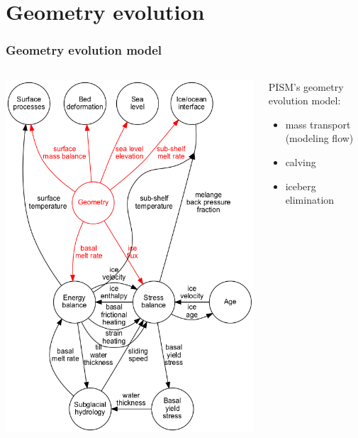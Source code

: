 \documentclass[hide notes,intlimits]{beamer}
\begin{document}
\section{Geometry evolution}
\label{sec:geometry-evolution}

\begin{frame}
  \frametitle{Geometry evolution model}

  \begin{columns}
    \begin{column}{0.45\linewidth}
      \includegraphics[width=\linewidth]{update-2-geometry}
    \end{column}
    \begin{column}{0.5\linewidth}
      PISM's geometry evolution model:
      \begin{itemize}
      \item mass transport (modeling flow)
      \item calving
      \item iceberg elimination
      \end{itemize}
    \end{column}
  \end{columns}
\end{frame}
\end{document}
